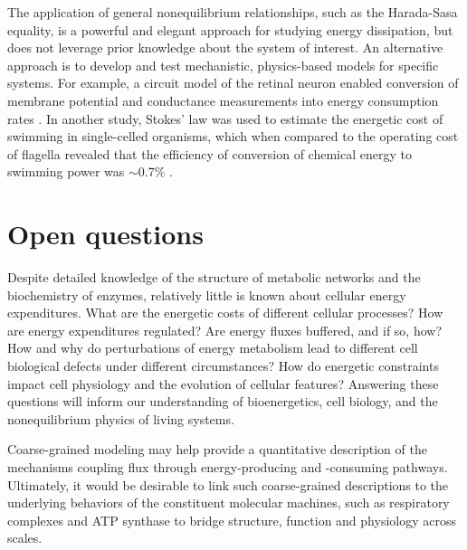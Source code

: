 \documentclass{compactarticle}
\begin{document}
The application of general nonequilibrium relationships, such as the Harada-Sasa equality, is a powerful and elegant approach for studying energy dissipation, but does not leverage prior knowledge about the system of interest. An alternative approach is to develop and test mechanistic,  physics-based models for specific systems. For example, a circuit model of the retinal neuron enabled conversion of membrane potential and conductance measurements into energy consumption rates \cite{laughlin_metabolic_1998}. In another study, Stokes' law was used to estimate the energetic cost of swimming in single-celled organisms, which when compared to the operating cost of flagella revealed that the efficiency of conversion of chemical energy to swimming power was $\sim$0.7\% \cite{schavemaker2022flagellar}.


\section{Open questions}

Despite detailed knowledge of the structure of metabolic networks and the biochemistry of enzymes, relatively little is known about cellular energy expenditures. What are the energetic costs of different cellular processes? How are energy expenditures regulated? Are energy fluxes buffered, and if so, how? How and why do perturbations of energy metabolism lead to different cell biological defects under different circumstances? How do energetic constraints impact cell physiology and the evolution of cellular features? Answering these questions will inform our understanding of bioenergetics, cell biology, and the nonequilibrium physics of living systems. 

Coarse-grained modeling \cite{Yang2021elife,basan2015,trickovic2022, lan2021,niebel2019} may help provide a quantitative description of the mechanisms coupling flux through energy-producing and -consuming pathways. Ultimately, it would be desirable to link such coarse-grained descriptions to the underlying behaviors of the constituent molecular machines, such as respiratory complexes and ATP synthase \cite{abhishek2019,martin2018} to bridge structure, function and physiology across scales.
\end{document}
